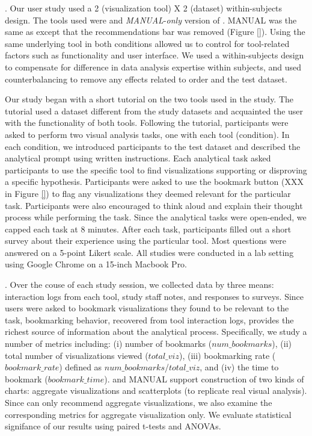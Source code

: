 .
Our user study used a 2 (visualization tool) X 2 (dataset) 
within-subjects design.
The tools used were \SeeDB and {\em MANUAL}-{\em only} version of \SeeDB.
MANUAL was the same as \SeeDB except that the recommendations bar was 
removed (Figure \ref{}).
Using the same underlying tool in both conditions allowed us to control for
tool-related factors such as functionality and user interface.
We used a within-subjects design to compensate for difference in data analysis
expertise within subjects, and used counterbalancing to remove any effects 
related to order and the test dataset.

Our study began with a short tutorial on the two tools used in the study.
The tutorial used a dataset different from the study datasets and acquainted
the user with the functionality of both tools.
Following the tutorial, participants were asked to perform two visual analysis 
tasks, one with each tool (condition).
In each condition, we introduced participants to the test dataset
and described the analytical prompt using written instructions.
Each analytical task asked participants to use the specific tool to find 
visualizations supporting or disproving a specific hypothesis.
Participants were asked to use the bookmark button (XXX in Figure \ref{}) to 
flag any visualizations they deemed relevant for the particular task.
Participants were also encouraged to think aloud and explain their thought process
while performing the task.
Since the analytical tasks were open-ended, we capped each task at 8 minutes.
After each task, participants filled out a short survey about their experience
using the particular tool.
Most questions were answered on a 5-point Likert scale.
All studies were conducted in a lab setting using Google Chrome on a 15-inch 
Macbook Pro.

.
Over the couse of each study session, we collected data by three means: interaction logs 
from each tool, study staff notes, and responses to surveys.
Since users were asked to bookmark visualizations they found to be relevant to the task,
bookmarking behavior, recovered from tool interaction logs, provides the richest source
of information about the analytical process.
Specifically, we study a number of metrics including: (i) number of bookmarks ($num\_bookmarks$), 
(ii) total number of visualizations viewed ($total\_viz$), 
(iii) bookmarking rate ($bookmark\_rate$) defined as $num\_bookmarks$/$total\_viz$, and 
(iv) the time to bookmark ($bookmark\_time$).
\SeeDB and MANUAL support construction of two kinds of charts: aggregate visualizations and 
scatterplots (to replicate real visual analysis).
Since \SeeDB can only recommend aggregate visualizations, we also examine the corresponding
metrics for aggregate visualization only.
We evaluate statistical signifance of our results using paired t-tests and ANOVAs.

